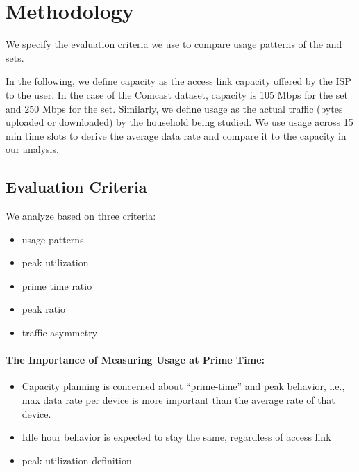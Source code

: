 \section{Methodology}
\label{sec:methodology}

We specify the evaluation criteria we use to compare usage 
patterns of the \test 
and \control sets.

In the following, we define capacity as the access link capacity offered by the 
ISP to the user. In the case of the Comcast dataset, capacity is 105 Mbps for 
the \control set and 250 Mbps for the \test set. Similarly, we define usage as 
the actual traffic (bytes uploaded or downloaded) by the household being 
studied. We use usage across 15 min time slots to derive the average data rate 
and compare it to the capacity in our analysis.


\subsection{Evaluation Criteria}

We analyze based on three criteria:
\begin{itemize}
\itemsep0em 
\item usage patterns
\item peak utilization
\item prime time ratio
\item peak ratio
\item traffic asymmetry 
\end{itemize}



\paragraph{The Importance of Measuring Usage at Prime Time:}
\begin{itemize}
\itemsep0em 
\item Capacity planning is concerned about “prime-time” and peak behavior, i.e., max data rate per device is more important than the average rate of that device.
\item Idle hour behavior is expected to stay the same, regardless of access link
\item peak utilization definition
\end{itemize}


